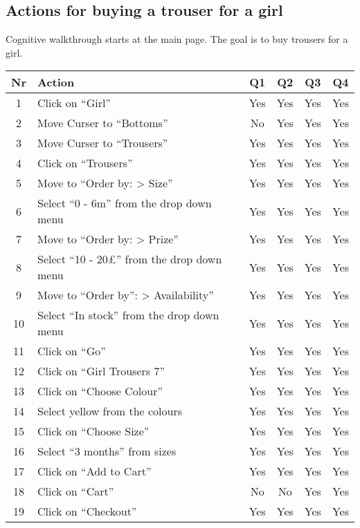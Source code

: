 \documentclass[fontsize=12pt,paper=a4]{scrartcl}
\begin{document}
\subsection{Actions for buying a trouser for a girl}
Cognitive walkthrough starts at the main page. The goal is to buy trousers for a girl.
\begin{table}[htdp]
\begin{center}
\begin{tabular}{|c|l|c|c|c|c|}
\hline
\textbf{Nr} & \textbf{Action} & \textbf{Q1} & \textbf{Q2} & \textbf{Q3} &\textbf{Q4} \\
\hline
1 & Click on ``Girl''& Yes & Yes & Yes & Yes\\
\hline
2 & Move Curser to ``Bottoms'' & No & Yes & Yes & Yes \\
\hline
3 & Move Curser to ``Trousers'' & Yes & Yes & Yes & Yes \\
\hline
4 & Click on ``Trousers'' & Yes & Yes & Yes & Yes \\
\hline
5 & Move to ``Order by: > Size'' & Yes & Yes & Yes & Yes \\
\hline
6 & Select ``0 - 6m'' from the drop down menu & Yes & Yes & Yes & Yes\\
\hline
7 & Move to ``Order by: > Prize'' & Yes & Yes & Yes & Yes \\
\hline
8 & Select ``10 - 20\pounds'' from the drop down menu & Yes & Yes & Yes & Yes\\
\hline
9 & Move to ``Order by'': > Availability'' & Yes & Yes & Yes & Yes \\
\hline
10 & Select ``In stock'' from the drop down menu & Yes & Yes & Yes & Yes\\
\hline
11 & Click on ``Go'' & Yes & Yes & Yes & Yes\\
\hline
12 & Click on ``Girl Trousers 7'' & Yes & Yes & Yes & Yes\\
\hline
13 & Click on ``Choose Colour'' & Yes & Yes & Yes & Yes\\
\hline
14 & Select yellow from the colours & Yes & Yes & Yes & Yes\\
\hline
15 & Click on ``Choose Size'' & Yes & Yes & Yes & Yes\\
\hline
16 & Select ``3 months'' from sizes & Yes & Yes & Yes & Yes\\
\hline
17 & Click on ``Add to Cart'' & Yes & Yes & Yes & Yes\\
\hline
18 & Click on ``Cart'' & No & No & Yes & Yes\\
\hline
19 & Click on ``Checkout'' & Yes & Yes & Yes & Yes\\

\end{tabular}
\end{center}
\end{table}
\end{document}
